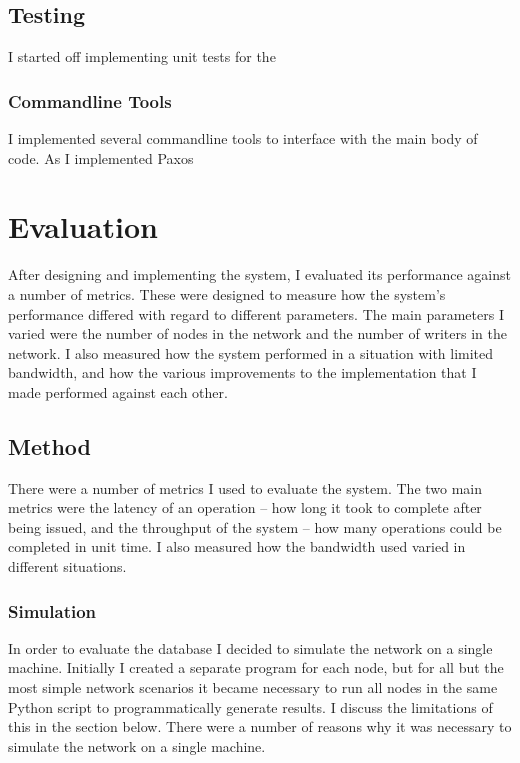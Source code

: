 \documentclass[12pt,twoside,notitlepage]{report}
\begin{document}
\section{Testing}

I started off implementing unit tests for the

\subsection{Commandline Tools}

I implemented several commandline tools to interface with the main body of code. As I implemented
Paxos

\cleardoublepage
\chapter{Evaluation}

After designing and implementing the system, I evaluated its performance against a number of
metrics. These were designed to measure how the system's performance differed with regard to
different parameters. The main parameters I varied were the number of nodes in the network and the
number of writers in the network. I also measured how the system performed in a situation with
limited bandwidth, and how the various improvements to the implementation that I made performed
against each other.

\section{Method}

There were a number of metrics I used to evaluate the system. The two main metrics were the
latency of an operation -- how long it took to complete after being issued, and the throughput of
the system -- how many operations could be completed in unit time. I also measured how the
bandwidth used varied in different situations.

\subsection{Simulation}

In order to evaluate the database I decided to simulate the network on a single machine. Initially
I created a separate program for each node, but for all but the most simple network scenarios it
became necessary to run all nodes in the same Python script to programmatically generate results.
I discuss the limitations of this in the section below. There were a number of reasons why it was
necessary to simulate the network on a single machine.
\end{document}
